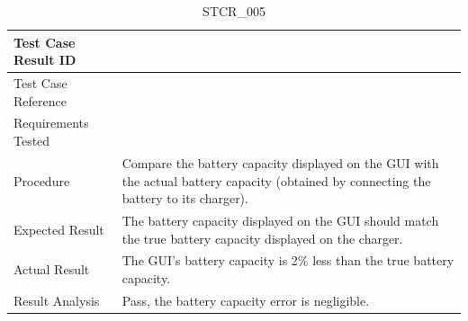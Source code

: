 \documentclass[12pt, titlepage]{article}
\begin{document}
\begin{table}[!h]
\begin{center}
\caption {STCR\_005}
\label{tab:STCR_005}
\begin{tabular}{ | m{3.2cm} | m{12.2cm} | } 
\hline
Test Case Result ID & \nameref{tab:STCR_005} \\ 
\hline
Test Case Reference & \nameref{tab:STC_005}  \\ 
\hline
Requirements Tested & \nameref{SR_003} \\ 
\hline
Procedure & Compare the battery capacity displayed on the GUI with the actual battery capacity (obtained by connecting the battery to its charger).  \\ 
\hline
Expected Result & The battery capacity displayed on the GUI should match the true battery capacity displayed on the charger.   \\ 
\hline
Actual Result & The GUI's battery capacity is 2\% less than the true battery capacity.  \\ 
\hline
Result Analysis & Pass, the battery capacity error is negligible.  \\ 
\hline
\end{tabular}
\end{center}
\end{table}
\end{document}

